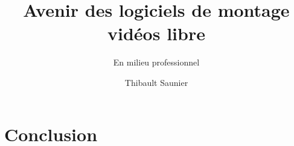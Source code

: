 \documentclass[a4paper,11pt]{article}
\begin{document}
\title{Avenir des logiciels de montage vidéos libre}
\subtitle{En milieu professionnel}
\author{Thibault Saunier}
\withdate
\subject{Les logiciels de montage vidéos libre en milieu professionnel}
\maketitle



{}
\thispagestyle{empty}
\setcounter{page}{0}

%




\section{Conclusion}

\newpage
\pagestyle{empty}
\tableofcontents
\listoffigures

\newpage


\newpage

\end{document}
